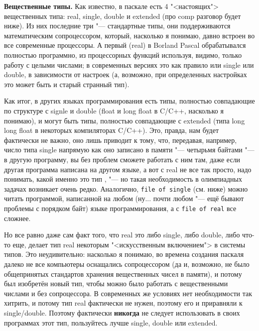 
\textbf{Вещественные типы.} Как известно, в паскале есть 4 "<настоящих"> вещественных типа: 
real, single, double и extended (про comp разговор будет ниже). Из них последние три "--- 
стандартные типы, они поддерживаются математическим сопроцессором, который, насколько я понимаю, 
давно встроен во все современные  процессоры. А первый (real) в Borland Pascal обрабатывался 
полностью программно, из процессорных функций используя, 
видимо, только работу с целыми числами; в современных версиях это как правило или single или 
double, в зависимости от настроек (а, возможно, при определенных настройках это может быть и старый странный тип).  

Как итог, в других языках программирования есть типы, полностью совпадающие 
по структуре с signle и double (float и long float в C/C++, насколько я понимаю), и могут быть 
типы, полностью совпадающие с extended (типа long long float в некоторых компиляторах C/C++). 
Это, правда, нам будет фактически не  
важно, оно лишь приводит к тому, что, передавая, например, число типа single напрямую как оно записано в 
памяти "--- четырьмя байтами "--- в другую программу, вы без проблем сможете работать с ним там, 
даже если другая программа написана на другом языке, а вот с real не все так просто, надо понимать, какой именно это тип , "--- но такая 
необходимость в олимпиадных задачах возникает очень редко.
Аналогично, \texttt{file of single} (см. ниже) можно читать программой, написанной на любом (ну... 
почти любом "--- ещё бывают проблемы с порядком байт) языке программирования, а с \texttt{file of 
real} все сложнее.

Но все равно даже сам факт того, что real это либо single, либо double, либо что-то еще, делает тип real некоторым "<искусственным 
включением"> в системы типов. Это неудивительно: насколько я понимаю, во времена создания паскаля 
далеко не все компьютеры оснащались сопроцессором (да и, возможно, не было общепринятых стандартов 
хранения вещественных чисел в памяти), и потому был изобретён новый тип, чтобы можно было работать 
с вещественными числами и без сопроцессора. В современных же условиях нет необходимости так 
хитрить, и потому тип real фактически не нужен, поэтому его и приравняли к single/double. Поэтому 
фактически \textbf{никогда} не следует использовать в своих программах этот тип, пользуйтесь лучше single, double или extended. 

